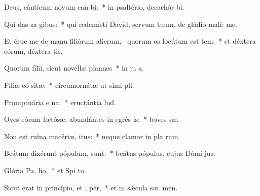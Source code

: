 \item Deus, cánticum novum can bi:~* in psaltério, decachór  bi.
\item Qui das sa gibus:~* qui redemísti David, servum tuum, de gládio malí:  me.
\item Et érue me de manu filiórum alierum,~\pscross{} quorum os locútum est tem:~* et déxtera eórum, déxtera tis.
\item Quorum fílii, sicut novéllæ plannes~* in ju a.
\item Fíliæ eó sitæ:~* circumornátæ ut simi pli.
\item Promptuária e na:~* eructántia    lud.
\item Oves eórum fœtósæ, abundántes in egrés is:~* boves  sæ.
\item Non est ruína macériæ,  itus:~* neque clamor in pla rum.
\item Beátum dixérunt pópulum,   sunt:~* beátus pópulus, cujus Dómi  jus.
\item Glória Pa,  lio,~* et Spi to.
\item Sicut erat in princípio, et ,  per,~* et in sǽcula sæ. men.
